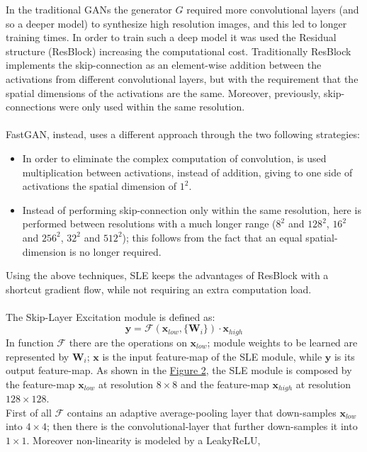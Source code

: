 \documentclass[12pt]{article}
\begin{document}
In the traditional GANs the generator $G$ required more convolutional layers (and so a deeper model) to synthesize 
high resolution images, and this led to longer training times. 
In order to train such a deep model it was used the Residual structure (ResBlock) increasing the computational cost.
Traditionally ResBlock implements the skip-connection as an element-wise addition between the activations from different
convolutional layers, but with the requirement that the spatial dimensions of the activations are the same.
Moreover, previously, skip-connections were only used within the same resolution.\\\\
FastGAN, instead, uses a different approach through the two following strategies:
\begin{itemize}
	\setlength\itemsep{0.01em}
	\item {	
	In order to eliminate the complex computation of convolution, is used multiplication between activations, instead of 
	addition, giving to one side of activations the spatial dimension of $1^2$.
	}
	\item {
	Instead of performing skip-connection only within the same resolution, here is performed between resolutions with a much
	longer range ($8^2$ and $128^2$, $16^2$ and $256^2$, $32^2$ and $512^2$); this follows from the fact that an equal spatial-dimension
	is no longer required.
	}
\end{itemize} 
Using the above techniques, SLE keeps the advantages of ResBlock with a shortcut gradient flow, while not requiring an extra computation
load.\\\\
The Skip-Layer Excitation module is defined as:
\begin{equation}
	\mathbf{y} = \mathcal{F}(\mathbf{x}_{low}, \{\mathbf{W}_i\})\cdot \mathbf{x}_{high}
\end{equation}
In function $\mathcal{F}$ there are the operations on $\mathbf{x}_{low}$; module weights to be learned 
are represented by $\mathbf{W}_i$; $\mathbf{x}$ is the input feature-map of the SLE module, while $\mathbf{y}$
is its output feature-map. As shown in the \hyperref[fig:fig2]{Figure 2}, the SLE module is composed by the 
feature-map $\mathbf{x}_{low}$ at resolution $8 \times 8$ and the feature-map $\mathbf{x}_{high}$ at resolution $128 \times 128$.\\
First of all $\mathcal{F}$ contains an adaptive average-pooling layer that down-samples $\mathbf{x}_{low}$ into $4 \times 4$; then
there is the convolutional-layer that further down-samples it into $1 \times 1$. Moreover non-linearity is modeled by a LeakyReLU,
\end{document}
